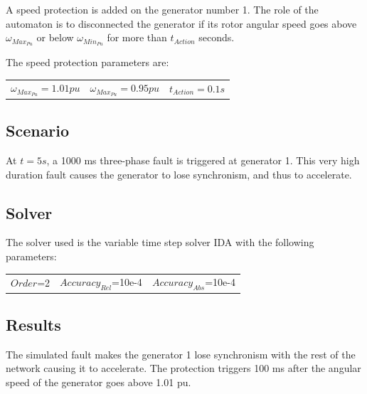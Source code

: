 \documentclass[a4paper, 12pt]{report}
\begin{document}
A speed protection is added on the generator number 1. The role of the automaton is to disconnected the generator if its rotor angular speed goes above \(\omega_{Max_{Pu}}\) or below \(\omega_{Min_{Pu}}\) for more than \(t_{Action}\) seconds.

The speed protection parameters are:
\begin{center}
\begin{tabular}{l|l|l}
   $\omega_{Max_{Pu}}=1.01pu$ & $\omega_{Max_{Pu}}=0.95pu$ & $t_{Action}=0.1s$  \\
\end{tabular}
\end{center}

\subsection{Scenario}
At $t=5s$, a 1000 ms three-phase fault is triggered at generator 1. This very high duration fault causes the generator to lose synchronism, and thus to accelerate.

\subsection{Solver}
The solver used is the variable time step solver IDA with the following parameters:
\begin{center}
\begin{tabular}{l|l|l}
   $Order$=2 & $Accuracy_{Rel}$=10e-4 & $Accuracy_{Abs}$=10e-4 \\
\end{tabular}
\end{center}

\newpage
\subsection{Results}

The simulated fault makes the generator 1 lose synchronism with the rest of the network causing it to accelerate. The protection triggers 100 ms after the angular speed of the generator goes above 1.01 pu.
\end{document}
